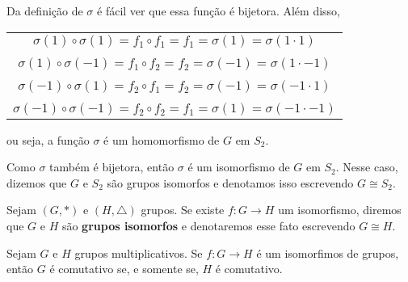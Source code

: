 \documentclass{beamer}
\begin{document}
    \begin{frame}
        Da definição de $\sigma$  é fácil ver que essa função é bijetora. Além disso,
        \begin{center}
            \begin{tabular}{c}
                $\sigma(1) \circ \sigma(1) = f_1 \circ f_1 = f_1 = \sigma(1) = \sigma(1 \cdot 1)$\\
                \\
                $\sigma(1) \circ \sigma(-1) = f_1 \circ f_2 = f_2 = \sigma(-1) = \sigma(1 \cdot -1)$\\
                \\
                $\sigma(-1) \circ \sigma(1) = f_2 \circ f_1 = f_2 = \sigma(-1) = \sigma(-1 \cdot 1)$\\
                \\
                $\sigma(-1) \circ \sigma(-1) = f_2 \circ f_2 = f_1 = \sigma(1) = \sigma(-1 \cdot -1)$\\
            \end{tabular}
        \end{center}
        ou seja, a função $\sigma$ é um homomorfismo de $G$ em $S_2$.

        Como $\sigma$ também é bijetora, então $\sigma$ é um isomorfismo de $G$ em $S_2$. Nesse caso, dizemos que $G$ e $S_2$ são grupos isomorfos e denotamos isso escrevendo $G \cong S_2$.
    \end{frame}

    \begin{frame}
        \begin{definicao}
            Sejam $(G, *)$ e $(H, \triangle)$ grupos. Se existe $f : G \to H$ um isomorfismo, diremos que $G$ e $H$ são \textbf{grupos isomorfos} e denotaremos esse fato escrevendo $G \cong H$.
        \end{definicao}
    \end{frame}

    \begin{frame}
        \begin{proposicao}
            Sejam $G$ e $H$ grupos multiplicativos. Se $f : G \to H$ é um isomorfimos de grupos, então $G$ é comutativo se, e somente se, $H$ é comutativo.
        \end{proposicao}
    \end{frame}
\end{document}
